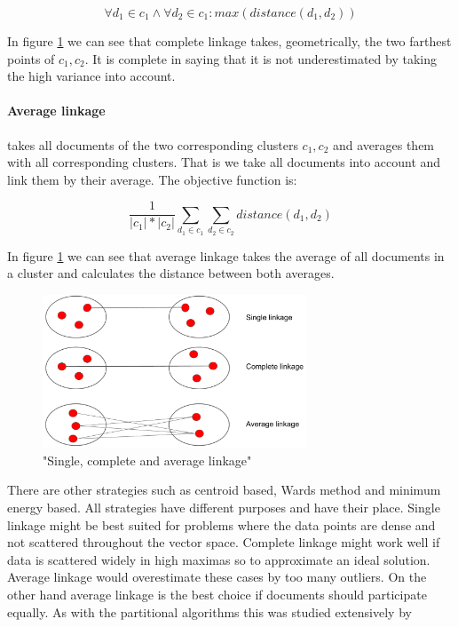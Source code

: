       \begin{equation}
        \forall d_1 \in c_1 \wedge \forall d_2 \in c_1: max(distance(d_1, d_2))
      \end{equation}

    In figure \ref{linkage_strategy} we can see that complete linkage takes, geometrically, the two farthest points of $c_1,c_2$. It is complete in saying that it is not underestimated by taking the high variance into account.

    \paragraph{Average linkage} takes all documents of the two corresponding clusters $c_1,c_2$ and averages them with all corresponding clusters. That is we take all documents into account and link them by their average. The objective function is:

      \begin{equation}
        \frac{1}{|c_1|*|c_2|} \sum_{d_1 \in c_1} \sum_{d_2 \in c_2} distance(d_1, d_2)
      \end{equation}

    In figure \ref{linkage_strategy} we can see that average linkage takes the average of all documents in a cluster and calculates the distance between both averages.

    \begin{figure}[h!]
      \centering
        \includegraphics[width=0.7\textwidth]{linkage_strategy.png}
        \caption{"Single, complete and average linkage"}
        \label{linkage_strategy}
    \end{figure}

    There are other strategies such as centroid based, Wards method and minimum energy based.
    All strategies have different purposes and have their place. Single linkage might be best suited for problems where the data points are dense and not scattered throughout the vector space. Complete linkage might work well if data is scattered widely in high maximas so to approximate an ideal solution. Average linkage would overestimate these cases by too many outliers. On the other hand average linkage is the best choice if documents should participate equally. As with the partitional algorithms this was studied extensively by \cite{ClusteringBooAggarwalk2013, ClusterAlgoSurveyIBM, IRBook2008}

